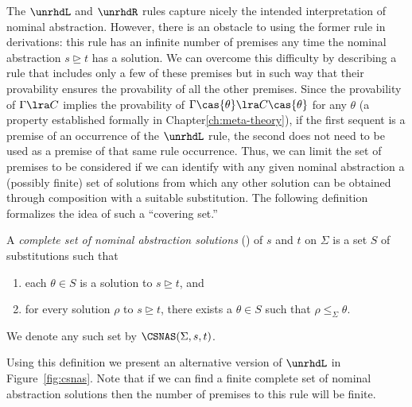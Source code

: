 The $\unrhdL$ and $\unrhdR$ rules capture nicely the intended
interpretation of nominal abstraction. However, there is an obstacle
to using the former rule in derivations: this rule has an infinite
number of premises any time the nominal abstraction $s \unrhd t$ has a
solution. We can overcome this difficulty by describing a rule that
includes only a few of these premises but in such way that their
provability ensures the provability of all the other premises.  Since
the provability of $\Gamma \lra C$ implies the provability of
$\Gamma\cas{\theta} \lra C\cas{\theta}$ for any $\theta$ (a property
established formally in Chapter\ref{ch:meta-theory}), if the first
sequent is a premise of an occurrence of the $\unrhdL$ rule, the
second does not need to be used as a premise of that same rule
occurrence.  Thus, we can limit the set of premises to be considered
if we can identify with any given nominal abstraction a (possibly
finite) set of solutions from which any other solution can be obtained
through composition with a suitable substitution. The following
definition formalizes the idea of such a ``covering set.''

\begin{definition}\label{csnas}
A {\em complete set of nominal abstraction solutions} (\CSNAS) of $s$
and $t$ on $\Sigma$
is a set $S$ of substitutions such
that
\begin{enumerate}
\item each $\theta \in S$ is a solution to $s \unrhd t$, and
\item for every solution $\rho$ to $s \unrhd t$, there exists a
$\theta \in S$ such that $\rho \leq_\Sigma \theta$.
\end{enumerate}
We denote any such set by $\CSNAS(\Sigma, s, t)$.
\end{definition}
Using this definition we present an alternative version of $\unrhdL$
in Figure~\ref{fig:csnas}. Note that if we can find a finite complete
set of nominal abstraction solutions then the number of premises to
this rule will be finite.


